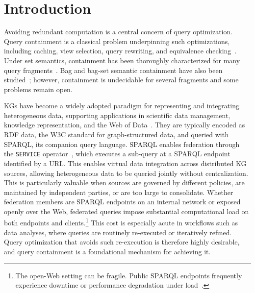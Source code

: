 \section{Introduction}

Avoiding redundant computation is a central concern of query optimization.
Query containment is a classical problem underpinning such optimizations, including caching, view selection, query rewriting, and equivalence checking~\cite{Afrati2019-ch1, DOAN201221, Chaudhuri1993}.
Under set semantics, containment has been thoroughly characterized for many query fragments~\cite{Chandra1977, aho1979equivalences, aho1979efficient, Chekuri2000}.
Bag and bag-set semantic containment have also been studied~\cite{Chaudhuri1993, Afrati2010, khamis2021bag}; however, containment is undecidable for several fragments and some problems remain open.

\acp{KG} have become a widely adopted paradigm for representing and integrating heterogeneous data, supporting applications in scientific data management, knowledge representation, and the Web of Data~\cite{hogan2021knowledge}.
They are typically encoded as \ac{RDF} data, the W3C standard for graph-structured data, and queried with SPARQL, its companion query language.
SPARQL enables federation through the \texttt{SERVICE} operator~\cite{w3SPARQLFederated}, which executes a sub-query at a SPARQL endpoint identified by a URL.
This enables virtual data integration across distributed \ac{KG} sources, allowing heterogeneous data to be queried jointly without centralization.
This is particularly valuable when sources are governed by different policies, are maintained by independent parties, or are too large to consolidate.
Whether federation members are SPARQL endpoints on an internal network or exposed openly over the Web, federated queries impose substantial computational load on both endpoints and clients.\footnote{The open-Web setting can be fragile. Public SPARQL endpoints frequently experience downtime or performance degradation under load~\cite{buil2013sparql}.}
This cost is especially acute in workflows such as data analyses, where queries are routinely re-executed or iteratively refined.
Query optimization that avoids such re-execution is therefore highly desirable, and query containment is a foundational mechanism for achieving it.

